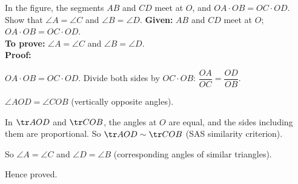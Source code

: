\begin{example}
In the figure, the segments $AB$ and $CD$ meet at $O$, and $OA\cdot OB=OC\cdot OD$. Show that $\angle A=\angle C$ and $\angle B=\angle D$.
\textbf{Given:} $AB$ and $CD$ meet at $O$; $OA\cdot OB=OC\cdot OD$.\\
\textbf{To prove:} $\angle A=\angle C$ and $\angle B=\angle D$.\\
\textbf{Proof:}
\begin{steps}
  \item $OA\cdot OB=OC\cdot OD$. Divide both sides by $OC\cdot OB$: $\dfrac{OA}{OC}=\dfrac{OD}{OB}$.
  \item $\angle AOD=\angle COB$ (vertically opposite angles).
  \item In $\tr AOD$ and $\tr COB$, the angles at $O$ are equal, and the sides including them are proportional. So $\tr AOD\sim\tr COB$ (SAS similarity criterion).
  \item So $\angle A=\angle C$ and $\angle D=\angle B$ (corresponding angles of similar triangles).
\end{steps}
Hence proved.
\end{example}

